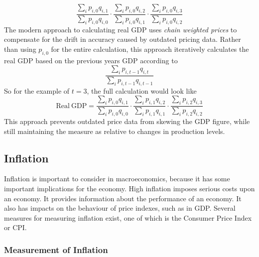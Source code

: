 \documentclass[12pt]{report}
\begin{document}
\begin{flushleft}
\[\frac{\sum_i p_{i,0}q_{i,1}}{\sum_i p_{i,0}q_{i,0}} \cdot 
\frac{\sum_i p_{i,0}q_{i,2}}{\sum_i p_{i,0}q_{i,1}} \cdot
\frac{\sum_i p_{i,0}q_{i,3}}{\sum_i p_{i,0}q_{i,2}}\]
The modern approach to calculating real GDP uses \textit{chain weighted prices}
to compensate for the drift in accuracy caused by outdated pricing data. Rather
than using \(p_{i,0}\) for the entire calculation, this approach iteratively
calculates the real GDP based on the previous years GDP according to
\[\frac{\sum_i p_{i,t - 1}q_{i,t}}{\sum_i p_{i,t - 1}q_{i,t - 1}}\]
So for the example of \(t = 3\), the full calculation would look like
\[\mathrm{Real}\:\mathrm{GDP} = 
\frac{\sum_i p_{i,0}q_{i,1}}{\sum_i p_{i,0}q_{i,0}} \cdot 
\frac{\sum_i p_{i,1}q_{i,2}}{\sum_i p_{i,1}q_{i,1}} \cdot
\frac{\sum_i p_{i,2}q_{i,3}}{\sum_i p_{i,2}q_{i,2}}\]
This approach prevents outdated price data from skewing the GDP figure, while
still maintaining the measure as relative to changes in production levels.

\subsection*{Inflation}

Inflation is important to consider in macroeconomics, because it has some 
important implications for the economy. High inflation imposes serious costs
upon an economy. It provides information about the performance of an economy.
It also has impacts on the behaviour of price indexes, such as in GDP. Several
measures for measuring inflation exist, one of which is the Consumer Price
Index or CPI.

\subsubsection*{Measurement of Inflation}


\end{flushleft}
\end{document}
